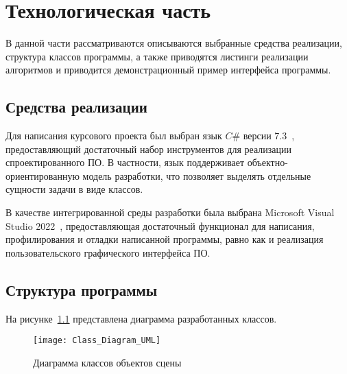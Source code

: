 \chapter{Технологическая часть}

В данной части рассматриваются описываются выбранные средства реализации, структура классов программы, а также приводятся листинги реализации алгоритмов и приводится демонстрационный пример интерфейса программы.

\section{Средства реализации}
Для написания курсового проекта был выбран язык $C\#$ версии 7.3~\cite{CSharp}, предоставляющий достаточный набор инструментов для реализации спроектированного ПО. В частности, язык поддерживает объектно-ориентированную модель разработки, что позволяет выделять отдельные сущности задачи в виде классов.

В качестве интегрированной среды разработки была выбрана Microsoft Visual Studio 2022~\cite{VS2022}, предоставляющая достаточный функционал для написания, профилирования и отладки написанной программы, равно как и реализация пользовательского графического интерфейса ПО.

\section{Структура программы}
На рисунке~\ref{fig:SceneObjects} представлена диаграмма разработанных классов.
\clearpage
\begin{figure}[H]
	\centering
	\texttt{[image: Class\_Diagram\_UML]}
	\caption{Диаграмма классов объектов сцены}
	\label{fig:SceneObjects}
\end{figure}


